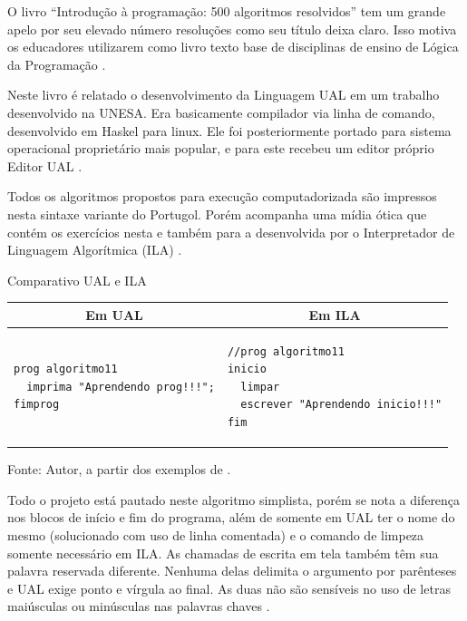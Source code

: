 O livro ``Introdução à programação: 500 algoritmos resolvidos'' tem um grande apelo por seu elevado número resoluções como seu título deixa claro. Isso motiva os educadores utilizarem como livro texto base de disciplinas de ensino de Lógica da Programação \cite{citar}.

Neste livro é relatado o desenvolvimento da Linguagem UAL em um trabalho desenvolvido na UNESA. Era basicamente compilador via linha de comando, desenvolvido em Haskel para linux. Ele foi posteriormente portado para sistema operacional proprietário mais popular, e para este recebeu um editor próprio Editor UAL \cite{citar}.

Todos os algoritmos propostos para execução computadorizada são impressos nesta sintaxe variante do Portugol. Porém acompanha uma mídia ótica que contém os exercícios nesta e também para a desenvolvida por  o Interpretador de Linguagem Algorítmica (ILA) \cite{citar}.

\begin{quadro}[h]
\centering
  \caption{Comparativo UAL e ILA}\label{qua:compare-ualila}
\begin{tabular}{| p{75mm} | p{75mm} |}\hline
\multicolumn{1}{|c|}{\textbf{Em UAL}} & \multicolumn{1}{|c|}{\textbf{Em ILA}} \\ \hline
\begin{lstlisting}[language=ual]
prog algoritmo11
  imprima "Aprendendo prog!!!";
fimprog
\end{lstlisting} &
\begin{lstlisting}[language=ila]
//prog algoritmo11
inicio
  limpar
  escrever "Aprendendo inicio!!!"
fim
\end{lstlisting} \\ \hline
\end{tabular}
  \caption*{\ifdraft{\color{green}}{}\footnotesize Fonte: Autor, a partir dos exemplos de .}
\end{quadro}

Todo o projeto está pautado neste algoritmo simplista, porém se nota a diferença nos blocos de início e fim do programa, além de somente em UAL ter o nome do mesmo (solucionado com uso de linha comentada) e o comando de limpeza somente necessário em ILA. As chamadas de escrita em tela também têm sua palavra reservada diferente. Nenhuma delas delimita o argumento por parênteses e UAL exige ponto e vírgula ao final. As duas não são sensíveis no uso de letras maiúsculas ou minúsculas nas palavras chaves \cite{citar}.

